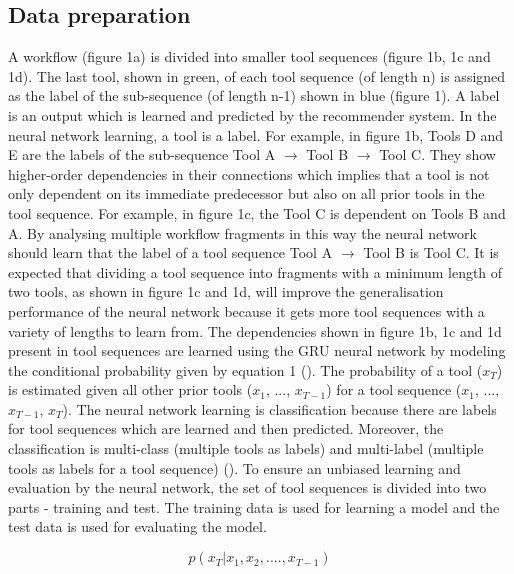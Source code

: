 \documentclass{bioinfo}
\begin{document}
\subsection{Data preparation}

A workflow (figure 1a) is divided into smaller tool sequences (figure 1b, 1c and 1d). The last tool, shown in green, of each tool sequence (of length n) is assigned as the label of the sub-sequence (of length n-1) shown in blue (figure 1). A label is an output which is learned and predicted by the recommender system. In the neural network learning, a tool is a label. For example, in figure 1b, Tools D and E are the labels of the sub-sequence Tool A $\rightarrow$ Tool B $\rightarrow$ Tool C. They show higher-order dependencies in their connections which implies that a tool is not only dependent on its immediate predecessor but also on all prior tools in the tool sequence. For example, in figure 1c, the Tool C is dependent on Tools B and A. By analysing multiple workflow fragments in this way the neural network should learn that the label of a tool sequence Tool A $\rightarrow$ Tool B is Tool C. It is expected that dividing a tool sequence into fragments with a minimum length of two tools, as shown in figure 1c and 1d, will improve the generalisation performance of the neural network because it gets more tool sequences with a variety of lengths to learn from. The dependencies shown in figure 1b, 1c and 1d present in tool sequences are learned using the GRU neural network by modeling the conditional probability given by equation 1 (\cite{Xue1600028}). The probability of a tool ($x_T$) is estimated given all other prior tools ($x_1$, $...$, $x_{T-1}$) for a tool sequence ($x_1$, $...$, $x_{T-1}$, $x_{T}$). The neural network learning is classification because there are labels for tool sequences which are learned and then predicted. Moreover, the classification is multi-class (multiple tools as labels) and multi-label (multiple tools as labels for a tool sequence) (\cite{Tsoumakas07multi-labelclassification}). To ensure an unbiased learning and evaluation by the neural network, the set of tool sequences is divided into two parts - training and test. The training data is used for learning a model and the test data is used for evaluating the model.

\begin{equation}
p(x_T|x_1,x_2,....,x_{T-1})
\end{equation}
\end{document}
